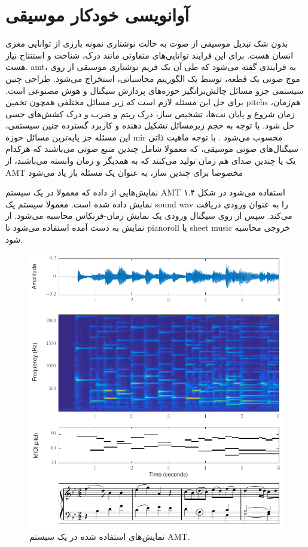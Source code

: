 \section{آوانویسی خودکار موسیقی}
بدون شک تبدیل موسیقی از صوت به حالت نوشتاری نمونه بارزی از توانایی مغزی انسان
هست. برای این فرایند توانایی‌های متفاوتی مانند درک، شناخت و استنتاج نیاز هست.
\gls{amt}، به فرایندی گفته می‌شود که طی آن یک فریم نوشتاری موسیقی از روی موج صوتی
یک قطعه، توسط یک الگوریتم محاسباتی، استخراج می‌شود. طراحی چنین سیستمی جزو مسائل
چالش‌برانگیز حوزه‌های پردازش سیگنال و هوش مصنوعی است. برای حل این مسئله لازم است
که زیر مسائل مختلفی همچون تخمین \glspl{pitch} هم‌زمان، زمان شروع و پایان نت‌ها،
تشخیص ساز، درک ریتم و ضرب و درک کشش‌های حسی حل شود. با توجه به حجم زیرمسائل
تشکیل دهنده و کاربرد گسترده چنین سیستمی، این مسئله جز پایه‌ترین مسائل حوزه
\gls{mir} محسوب می‌شود \cite{klapuri2007signal,benetos2013automatic}. با توجه
ماهیت ذاتی سیگنال‌های صوتی موسیقی، که معمولا شامل چندین منبع صوتی می‌باشند که
هرکدام یک یا چندین صدای هم زمان تولید می‌کنند که به همدیگر و زمان وابسته
می‌باشند، از \gls{AMT} مخصوصا برای چندین ساز، به عنوان یک مسئله باز یاد می‌شود
\cite{benetos2013automatic}

نمایش‌هایی از داده که معمولا در یک سیستم \gls{AMT} استفاده می‌شود در شکل ۱.۴
نمایش داده شده است. معمولا سیستم یک \gls{sound wav} را به عنوان ورودی دریافت
می‌کند. سپس از روی سیگنال ورودی یک نمایش زمان-فرنکاس محاسبه می‌شود. از نمایش به
دست آمده استفاده می‌شود تا \gls{pianoroll} یا \gls{sheet music} خروجی محاسبه
شود.
\begin{figure}[]
    \centering
    \includegraphics[width=12cm]{./statics/amt_data.png}
    \caption{نمایش‌های استفاده شده در یک سیستم \gls{AMT}.}
\end{figure}

